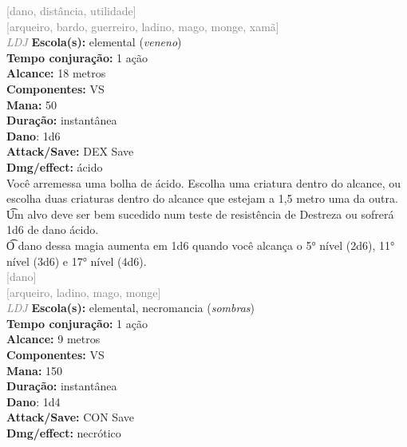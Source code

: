 \documentclass{RPG_Adventure}[2021/10/20]
\begin{document}
{\scriptsize \textcolor{gray}{[dano, distância, utilidade]\\}}
{\scriptsize \textcolor{gray}{[arqueiro, bardo, guerreiro, ladino, mago, monge, xamã]\\}}
{\tiny \textcolor{gray}{\textit{LDJ}}}\jump{}
{\small \t \textbf{Escola(s):} elemental (\textit{veneno})\\\t \textbf{Tempo conjuração:} 1 ação\\\t \textbf{Alcance:} 18 metros\\\t \textbf{Componentes:} VS\\\t \textbf{Mana:} 50\\\t \textbf{Duração:} instantânea\\\t \textbf{Dano}: 1d6\\\t \textbf{Attack/Save:} DEX Save\\\t \textbf{Dmg/effect:} ácido\\}
{\normalsize Você arremessa uma bolha de ácido. Escolha uma criatura dentro do alcance, ou escolha duas criaturas dentro do alcance que estejam a 1,5 metro uma da outra.\\\t Um alvo deve ser bem sucedido num teste de resistência de Destreza ou sofrerá 1d6 de dano ácido.\\\t O dano dessa magia aumenta em 1d6 quando você alcança o 5° nível (2d6), 11° nível (3d6) e 17° nível (4d6).\\}
{\scriptsize \textcolor{gray}{[dano]\\}}
{\scriptsize \textcolor{gray}{[arqueiro, ladino, mago, monge]\\}}
{\tiny \textcolor{gray}{\textit{LDJ}}}\jump{}
{\small \t \textbf{Escola(s):} elemental, necromancia (\textit{sombras})\\\t \textbf{Tempo conjuração:} 1 ação\\\t \textbf{Alcance:} 9 metros\\\t \textbf{Componentes:} VS\\\t \textbf{Mana:} 150\\\t \textbf{Duração:} instantânea\\\t \textbf{Dano}: 1d4\\\t \textbf{Attack/Save:} CON Save\\\t \textbf{Dmg/effect:} necrótico\\}
\end{document}

